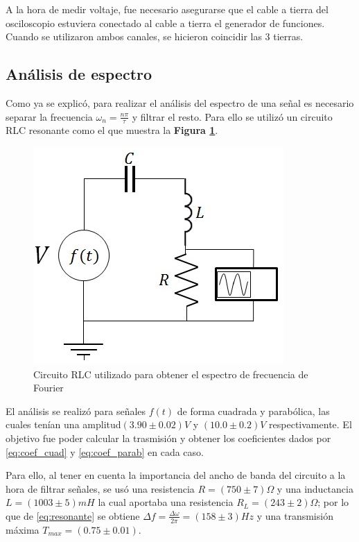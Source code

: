 \documentclass[11pt,a4paper]{article}
\begin{document}
A la hora de medir voltaje, fue necesario asegurarse que el cable a tierra del osciloscopio estuviera conectado al cable a tierra el generador de funciones. Cuando se utilizaron ambos canales, se hicieron coincidir las 3 tierras.

\subsection{Análisis de espectro}

Como ya se explicó, para realizar el análisis del espectro de una señal es necesario separar la frecuencia $\omega_n = \frac{n \pi}{\tau}$ y filtrar el resto. Para ello se utilizó un circuito RLC resonante como el que muestra la \textbf{Figura \ref{fig:RLC-espectro}}.

\begin{figure}[h]
\centering
\includegraphics[scale=.7]{RLC-espectro}
\caption{Circuito RLC utilizado para obtener el espectro de frecuencia de Fourier}
\label{fig:RLC-espectro}
\end{figure}

El análisis se realizó para señales $f(t)$  de forma cuadrada y parabólica, las cuales tenían una amplitud$(3.90 \pm 0.02)V$ y $(10.0 \pm 0.2)V$ respectivamente. El objetivo fue poder calcular la trasmisión y obtener los coeficientes dados por \eqref{eq:coef_cuad} y \eqref{eq:coef_parab} en cada caso.

Para ello, al tener en cuenta la importancia del ancho de banda del circuito a la hora de filtrar señales, se usó una resistencia $R=(750 \pm 7)\Omega$ y una inductancia $L=(1003 \pm 5)mH$ la cual aportaba una resistencia $R_L = (243 \pm 2)\Omega$; por lo que de \eqref{eq:resonante} se obtiene $ \Delta f = \frac{\Delta \omega}{2\pi} = (158 \pm 3)Hz$ y una transmisión máxima $T_{max}=(0.75 \pm 0.01)$.
\end{document}
